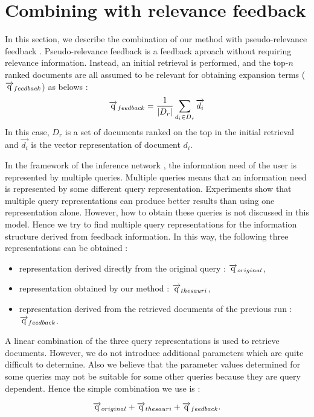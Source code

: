 \section{Combining with relevance feedback}
In this section, we describe the combination of our method with pseudo-relevance feedback \cite{buckley94,buckley95,salton90}. Pseudo-relevance feedback is a feedback aproach without requiring relevance information. Instead, an initial retrieval is performed, and the top-$n$ ranked documents are all assumed to be relevant for obtaining expansion terms ($\overrightarrow{\rm q}_{feedback}$) as belows :
\[\overrightarrow{\rm q}_{feedback}= \frac{1}{|D_r|}  \sum_{d_i \in D_r} \overrightarrow{d_i}\]
In this case, $D_r$ is a set of documents ranked on the top in the initial retrieval and $\overrightarrow{d_i}$ is the vector representation of document $d_i$.

In the framework of the inference network \cite{xu96}, the information need of the user is represented by multiple queries. Multiple queries means that an information need is represented by some different query representation. Experiments show that multiple query representations can produce better results than using one representation alone. However, how to obtain these queries is not discussed in this model. Hence we try to find multiple query representations for the information structure derived from feedback information. In this way, the following three representations can be obtained :

\begin{itemize}
\item representation derived directly from the original query : $ \overrightarrow{\rm q}_{original}$,
\item representation obtained by our method : $\overrightarrow{\rm q}_{thesauri}$,
\item representation derived from the retrieved documents of the previous run : $\overrightarrow{\rm q}_{feedback}$.
\end{itemize}

A linear combination of the three query representations is used to retrieve documents. However, we do not introduce additional parameters which are quite difficult to determine. Also we believe that the parameter values determined for some queries may not be suitable for some other queries because they are query dependent. Hence the simple combination we use is :

\[\overrightarrow{\rm q}_{original}+\overrightarrow{\rm q}_{thesauri} + \overrightarrow{\rm q}_{feedback}.\]

